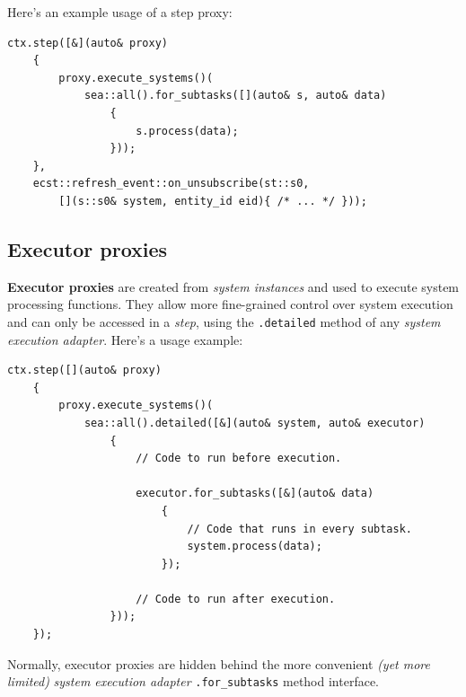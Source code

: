 \documentclass[twoside, 12pt, a4paper, openany]{book}
\begin{document}
Here's an example usage of a step proxy:

\begin{verbatim}
ctx.step([&](auto& proxy)
    {
        proxy.execute_systems()(
            sea::all().for_subtasks([](auto& s, auto& data)
                {
                    s.process(data);
                }));
    },
    ecst::refresh_event::on_unsubscribe(st::s0,
        [](s::s0& system, entity_id eid){ /* ... */ }));
\end{verbatim}

\subsection{Executor proxies}\label{executor-proxies}

\textbf{Executor proxies} are created from \emph{system instances} and
used to execute system processing functions. They allow more
fine-grained control over system execution and can only be accessed in a
\emph{step}, using the
\texttt{.detailed}
method of any \emph{system execution adapter}. Here's a usage example:

\begin{verbatim}
ctx.step([](auto& proxy)
    {
        proxy.execute_systems()(
            sea::all().detailed([&](auto& system, auto& executor)
                {
                    // Code to run before execution.

                    executor.for_subtasks([&](auto& data)
                        {
                            // Code that runs in every subtask.
                            system.process(data);
                        });

                    // Code to run after execution.
                }));
    });
\end{verbatim}

Normally, executor proxies are hidden behind the more convenient
\emph{(yet more limited)} \emph{system execution adapter}
\texttt{.for_subtasks}
method interface.
\end{document}
